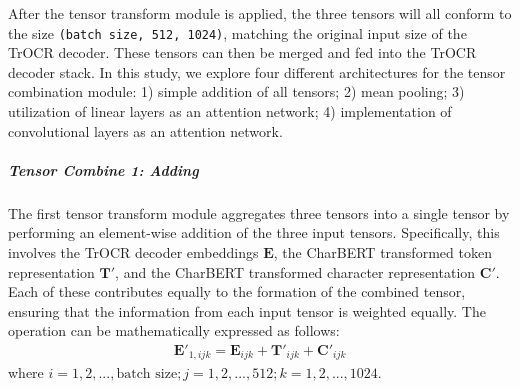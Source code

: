 After the tensor transform module is applied, the three tensors will all conform to the size \texttt{(batch size, 512, 1024)}, matching the original input size of the TrOCR decoder. These tensors can then be merged and fed into the TrOCR decoder stack. In this study, we explore four different architectures for the tensor combination module: 1) simple addition of all tensors; 2) mean pooling; 3) utilization of linear layers as an attention network; 4) implementation of convolutional layers as an attention network.

\subparagraph*{Tensor Combine 1: Adding}
\label{subpar:3_adding}
The first tensor transform module aggregates three tensors into a single tensor by performing an element-wise addition of the three input tensors. Specifically, this involves the TrOCR decoder embeddings $\mathbf{E}$, the CharBERT transformed token representation $\mathbf{T'}$, and the CharBERT transformed character representation $\mathbf{C'}$. Each of these contributes equally to the formation of the combined tensor, ensuring that the information from each input tensor is weighted equally. The operation can be mathematically expressed as follows:
\begin{equation} \label{eq:3_tensor_combine_adding}
    \begin{split}
        \mathbf{E}'_{1, ijk} = \mathbf{E}_{ijk} + \mathbf{T}'_{ijk} + \mathbf{C}'_{ijk}
    \end{split}
\end{equation}
where $i = 1, 2, ..., \text{batch size}; j = 1, 2, ..., 512; k = 1, 2, ..., 1024$.


